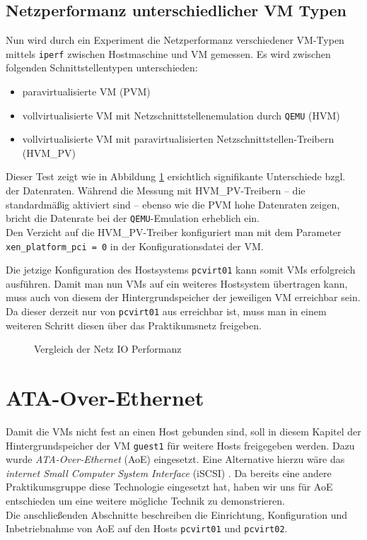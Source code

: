 \section{Netzperformanz unterschiedlicher VM Typen}\label{perf}

Nun wird durch ein Experiment die Netzperformanz verschiedener VM-Typen mittels \verb#iperf# zwischen Hostmaschine und VM gemessen. Es wird zwischen folgenden Schnittstellentypen unterschieden:
\begin{itemize}
\item paravirtualisierte VM (PVM)
\item vollvirtualisierte VM mit Netzschnittstellenemulation durch \verb#QEMU# (HVM)
\item vollvirtualisierte VM mit paravirtualisierten Netzschnittstellen-Treibern (HVM\_PV)
\end{itemize}

Dieser Test zeigt wie in Abbildung \ref{megaplot} ersichtlich signifikante Unterschiede bzgl. der Datenraten. Während die Messung mit HVM\_PV-Treibern -- die standardmäßig aktiviert sind -- ebenso wie die PVM hohe Datenraten zeigen, bricht die Datenrate bei der \verb#QEMU#-Emulation erheblich ein.
\\
Den Verzicht auf die HVM\_PV-Treiber konfiguriert man mit dem Parameter \verb#xen_platform_pci = 0# in der Konfigurationsdatei der VM.

Die jetzige Konfiguration des Hostsystems \verb#pcvirt01# kann somit VMs erfolgreich ausführen. Damit man nun VMs auf ein weiteres Hostsystem übertragen kann, muss auch von diesem der Hintergrundspeicher der jeweiligen VM erreichbar sein. Da dieser derzeit nur von \verb#pcvirt01# aus erreichbar ist, muss man in einem weiteren Schritt diesen über das Praktikumsnetz freigeben.
\begin{figure}

\caption{Vergleich der Netz IO Performanz}
\label{megaplot}
\end{figure}
\chapter{ATA-Over-Ethernet}
\label{chap:aoe}
Damit die VMs nicht fest an einen Host gebunden sind, soll in diesem Kapitel der Hintergrundspeicher der VM \verb#guest1# für weitere Hosts freigegeben werden. Dazu wurde \emph{ATA-Over-Ethernet} (AoE) \cite{hopkins2006aoe} eingesetzt. Eine Alternative hierzu wäre das \emph{internet Small Computer System Interface} (iSCSI) \cite{rfc3720}. Da bereits eine andere Praktikumsgruppe diese Technologie eingesetzt hat, haben wir uns für AoE entschieden um eine weitere mögliche Technik zu demonstrieren. 
\\
Die anschließenden Abschnitte beschreiben die Einrichtung, Konfiguration und Inbetriebnahme von AoE auf den Hosts \verb#pcvirt01# und \verb#pcvirt02#.

